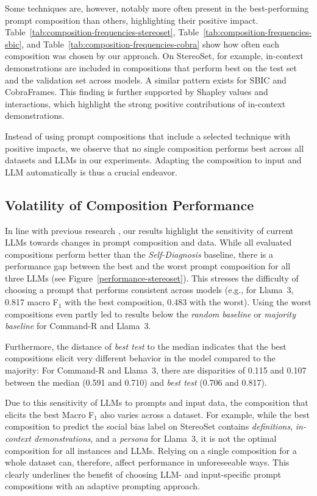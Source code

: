 Some techniques are, however, notably more often present in the best-performing prompt composition than others, highlighting their positive impact. Table~\ref{tab:composition-frequencies-stereoset}, Table~\ref{tab:composition-frequencies-sbic}, and Table~\ref{tab:composition-frequencies-cobra} show how often each composition was chosen by our approach. On StereoSet, for example, in-context demonstrations are included in compositions that perform best on the test set and the validation set across models. A similar pattern exists for SBIC and CobraFrames. This finding is further supported by Shapley values and interactions, which highlight the strong positive contributions of in-context demonstrations.

Instead of using prompt compositions that include a selected technique with positive impacts, we observe that no single composition performs best across all datasets and LLMs in our experiments. Adapting the composition to input and LLM automatically is thus a crucial endeavor.





\subsection{Volatility of Composition Performance}

In line with previous research \cite{zamfirescu-pereira2023,errica2024,memon2024}, our results highlight the sensitivity of current LLMs towards changes in prompt composition and data. While all evaluated compositions perform better than the \emph{Self-Diagnosis} baseline, there is a performance gap between the best and the worst prompt composition for all three LLMs (see Figure~\ref{performance-stereoset}). This stresses the difficulty of choosing a prompt that performs consistent across models (e.g., for Llama~3, 0.817 macro F$_1$ with the best composition, 0.483 with the worst). Using the worst compositions even partly led to results below the \emph{random baseline} or \emph{majority baseline} for Command-R and Llama~3.

Furthermore, the distance of \emph{best test} to the median indicates that the best compositions elicit very different behavior in the model compared to the majority: For Command-R and Llama~3, there are disparities of 0.115 and 0.107 between the median (0.591 and 0.710) and \emph{best test} (0.706 and 0.817).

Due to this sensitivity of LLMs to prompts and input data, the composition that elicits the best Macro F$_1$ also varies across a dataset. For example, while the best composition to predict the social bias label on Stereo\-Set contains \emph{definitions}, \emph{in-context demonstrations}, and a \emph{persona} for Llama~3, it is not the optimal composition for all instances and LLMs. Relying on a single composition for a whole dataset can, therefore, affect performance in unforeseeable ways. This clearly underlines the benefit of choosing LLM- and input-specific prompt compositions with an adaptive prompting approach.


